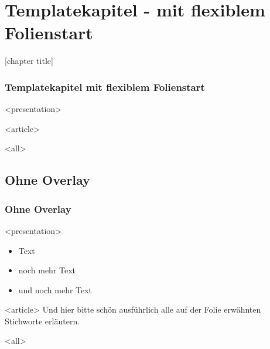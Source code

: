 
\section{Templatekapitel - mit flexiblem Folienstart}

{%
[chapter title]
\begin{frame}[fragile]
\frametitle<presentation>{Templatekapitel mit flexiblem Folienstart}




\mode
<presentation>

\mode
<article>


\mode
<all>

\end{frame}
}
\newpage

\subsection{Ohne Overlay}

\begin{frame}[fragile]
\frametitle<presentation>{Ohne Overlay}


\mode
<presentation>
\begin{itemize}
 \item Text
 \item noch mehr Text
 \item und noch mehr Text
\end{itemize}


\mode
<article>
Und hier bitte schön ausführlich alle auf der Folie erwähnten Stichworte erläutern.



\mode
<all>

\end{frame}
\newpage


